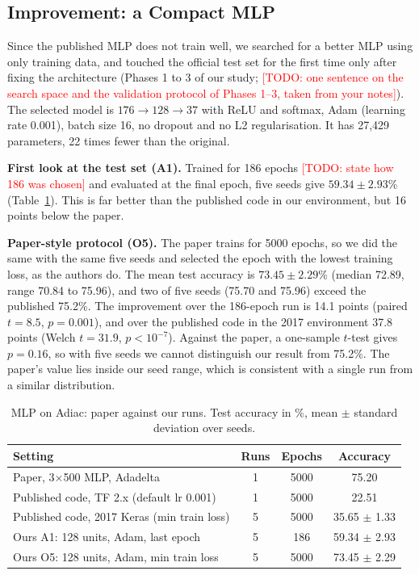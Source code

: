\documentclass[conference]{IEEEtran}
\newcommand{\todo}[1]{\textcolor{red}{[TODO: #1]}}
\begin{document}
\subsection{Improvement: a Compact MLP}
Since the published MLP does not train well, we searched for a better MLP using only training data, and touched the official test set for the first time only after fixing the architecture (Phases 1 to 3 of our study; \todo{one sentence on the search space and the validation protocol of Phases 1--3, taken from your notes}). The selected model is $176\to128\to37$ with ReLU and softmax, Adam (learning rate 0.001), batch size 16, no dropout and no L2 regularisation. It has 27,429 parameters, 22 times fewer than the original.

\textbf{First look at the test set (A1).} Trained for 186 epochs \todo{state how 186 was chosen} and evaluated at the final epoch, five seeds give $59.34\pm2.93$\% (Table~\ref{tab:mlp}). This is far better than the published code in our environment, but 16 points below the paper.

\textbf{Paper-style protocol (O5).} The paper trains for 5000 epochs, so we did the same with the same five seeds and selected the epoch with the lowest training loss, as the authors do. The mean test accuracy is $73.45\pm2.29$\% (median 72.89, range 70.84 to 75.96), and two of five seeds (75.70 and 75.96) exceed the published 75.2\%. The improvement over the 186-epoch run is 14.1 points (paired $t=8.5$, $p=0.001$), and over the published code in the 2017 environment 37.8 points (Welch $t=31.9$, $p<10^{-7}$). Against the paper, a one-sample $t$-test gives $p=0.16$, so with five seeds we cannot distinguish our result from 75.2\%. The paper's value lies inside our seed range, which is consistent with a single run from a similar distribution.

\begin{table}[htbp]
\caption{MLP on Adiac: paper against our runs. Test accuracy in \%, mean $\pm$ standard deviation over seeds.}
\begin{center}
\footnotesize
\setlength{\tabcolsep}{3pt}
\begin{tabular}{|p{4.6cm}|c|c|c|}
\hline
\textbf{Setting} & \textbf{Runs} & \textbf{Epochs} & \textbf{Accuracy} \\
\hline
Paper, 3$\times$500 MLP, Adadelta & 1 & 5000 & 75.20 \\
Published code, TF 2.x (default lr 0.001) & 1 & 5000 & 22.51 \\
Published code, 2017 Keras (min train loss) & 5 & 5000 & 35.65 $\pm$ 1.33 \\
Ours A1: 128 units, Adam, last epoch & 5 & 186 & 59.34 $\pm$ 2.93 \\
Ours O5: 128 units, Adam, min train loss & 5 & 5000 & 73.45 $\pm$ 2.29 \\
\hline
\end{tabular}
\label{tab:mlp}
\end{center}
\end{table}
\end{document}
